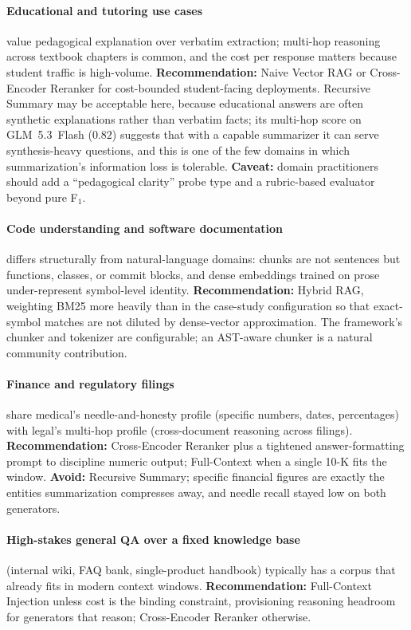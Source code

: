 \documentclass[conference,a4paper,10pt]{IEEEtran}
\begin{document}
\paragraph{Educational and tutoring use cases} value pedagogical explanation over verbatim extraction; multi-hop reasoning across textbook chapters is common, and the cost per response matters because student traffic is high-volume.
\textbf{Recommendation:} Naive Vector RAG or Cross-Encoder Reranker for cost-bounded student-facing deployments.
Recursive Summary may be acceptable here, because educational answers are often synthetic explanations rather than verbatim facts; its multi-hop score on GLM~5.3~Flash ($0.82$) suggests that with a capable summarizer it can serve synthesis-heavy questions, and this is one of the few domains in which summarization's information loss is tolerable.
\textbf{Caveat:} domain practitioners should add a ``pedagogical clarity'' probe type and a rubric-based evaluator beyond pure F$_1$.

\paragraph{Code understanding and software documentation} differs structurally from natural-language domains: chunks are not sentences but functions, classes, or commit blocks, and dense embeddings trained on prose under-represent symbol-level identity.
\textbf{Recommendation:} Hybrid RAG, weighting BM25 more heavily than in the case-study configuration so that exact-symbol matches are not diluted by dense-vector approximation.
The framework's chunker and tokenizer are configurable; an AST-aware chunker is a natural community contribution.

\paragraph{Finance and regulatory filings} share medical's needle-and-honesty profile (specific numbers, dates, percentages) with legal's multi-hop profile (cross-document reasoning across filings).
\textbf{Recommendation:} Cross-Encoder Reranker plus a tightened answer-formatting prompt to discipline numeric output; Full-Context when a single 10-K fits the window.
\textbf{Avoid:} Recursive Summary; specific financial figures are exactly the entities summarization compresses away, and needle recall stayed low on both generators.

\paragraph{High-stakes general QA over a fixed knowledge base} (internal wiki, FAQ bank, single-product handbook) typically has a corpus that already fits in modern context windows.
\textbf{Recommendation:} Full-Context Injection unless cost is the binding constraint, provisioning reasoning headroom for generators that reason; Cross-Encoder Reranker otherwise.
\end{document}

